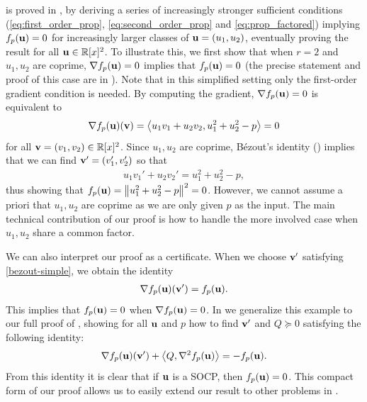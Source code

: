 \documentclass[final,onefignum,onetabnum]{siamart220329}
\begin{document}
 is proved in , by deriving a series of
increasingly stronger sufficient conditions (\eqref{eq:first_order_prop},
\eqref{eq:second_order_prop} and \eqref{eq:prop_factored}) implying
$f_p(\boldsymbol{\mathbf{u}}) = 0$ for increasingly larger classes of $\boldsymbol{\mathbf{u}}= (u_1, u_2)$,
eventually proving the result for all $\boldsymbol{\mathbf{u}} \in \mathbb{R}[x]^2$. To illustrate
this, we first show that when $r=2$ and $u_1, u_2$ are coprime,
$\nabla f_p(\boldsymbol{\mathbf{u}}) = 0$ implies that $f_p(\boldsymbol{\mathbf{u}}) = 0$ (the precise
statement and proof of this case are in ). Note that in this
simplified setting only the first-order gradient condition is needed. By
computing the gradient, $\nabla f_p(\boldsymbol{\mathbf{u}}) = 0$ is equivalent to
\begin{align*}
  \nabla f_p(\boldsymbol{\mathbf{u}})(\boldsymbol{\mathbf{v}}) = \left\langle u_1 v_1 + u_2v_2, u_1^2 + u_2^2 - p \right\rangle = 0
\end{align*}
for all $\boldsymbol{\mathbf{v}} = (v_1, v_2) \in \mathbb{R}[x]^2$. Since $u_1, u_2$ are coprime,
B\'ezout's identity () implies that we can find
$\boldsymbol{\mathbf{v}}' = (v_1', v_2')$ so that
\begin{align} \label{bezout-simple}
  u_1 v_1' + u_2 v_2' = u_1^2 + u_2^2 - p,
\end{align}
thus showing that $f_p(\boldsymbol{\mathbf{u}}) = \left\lVert u_1^2 + u_2^2 - p \right\lVert^2 = 0$. However, we
cannot assume a priori that $u_1, u_2$ are coprime as we are only given $p$ as
the input. The main technical contribution of our proof is how to handle the
more involved case when $u_1, u_2$ share a common factor.

We can also interpret our proof as a certificate. When we choose $\boldsymbol{\mathbf{v}}'$
satisfying \eqref{bezout-simple}, we obtain the identity
\begin{align*}
  \nabla f_p(\boldsymbol{\mathbf{u}})(\boldsymbol{\mathbf{v}}') = f_p(\boldsymbol{\mathbf{u}}).
\end{align*}
This implies that $f_p(\boldsymbol{\mathbf{u}}) = 0$ when $\nabla f_p(\boldsymbol{\mathbf{u}}) = 0$. In
 we generalize this example to our full proof of ,
showing for all $\boldsymbol{\mathbf{u}}$ and $p$ how to find $\boldsymbol{\mathbf{v}}'$ and $Q \succeq 0$
satisfying the following identity:
\begin{align*}
  \nabla f_p(\boldsymbol{\mathbf{u}})(\boldsymbol{\mathbf{v}}') + \left\langle Q, \nabla^2 f_p(\boldsymbol{\mathbf{u}}) \right\rangle= -f_p(\boldsymbol{\mathbf{u}}).
\end{align*}
From this identity it is clear that if $\boldsymbol{\mathbf{u}}$ is a SOCP, then
$f_p(\boldsymbol{\mathbf{u}}) = 0$. This compact form of our proof allows us to easily extend
our result to other problems in .
\end{document}
